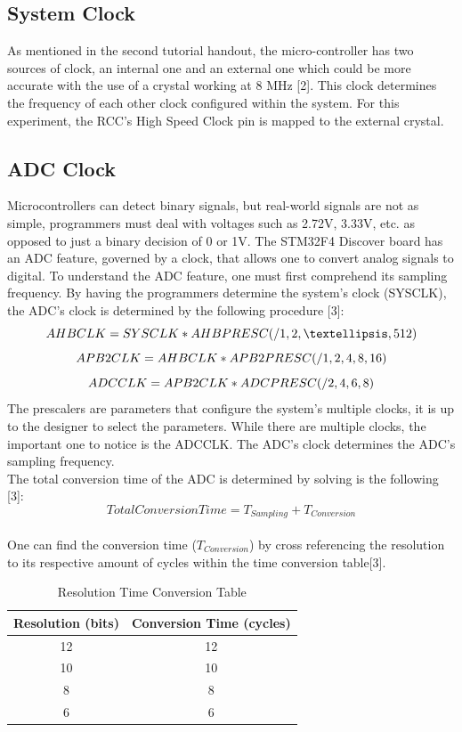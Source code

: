 \documentclass[12pt]{report}
\begin{document}
\subsection{System Clock}
As mentioned in the second tutorial handout, the micro-controller has two sources of clock, an internal one and an external one which could be more accurate with the use of a crystal working at 8 MHz [2]. This clock determines the frequency of each other clock configured within the system. For this experiment, the RCC’s High Speed Clock pin is mapped to the external crystal.
\subsection{ADC Clock}
Microcontrollers can detect binary signals, but real-world signals are not as simple, programmers must deal with voltages such as 2.72V, 3.33V, etc. as opposed to just a binary decision of 0 or 1V. The STM32F4 Discover board has an ADC feature, governed by a clock, that allows one to convert analog signals to digital. To understand the ADC feature, one must first comprehend its sampling frequency.
By having the programmers determine the system’s clock (SYSCLK), the ADC’s clock is determined by the following procedure [3]:\\
\[ AHBCLK = SYSCLK * AHBPRESC (/1, 2, …, 512)\\ \]
\[ APB2CLK = AHBCLK * APB2PRESC (/1, 2, 4, 8, 16)\\ \]
\[ ADCCLK = APB2CLK * ADCPRESC (/2, 4, 6, 8)\\ \]
The prescalers are parameters that configure the system’s multiple clocks, it is up to the designer to select the parameters. While there are multiple clocks, the important one to notice is the ADCCLK. The ADC’s clock determines the ADC’s sampling frequency.\\
The total conversion time of the ADC is determined by solving is the following [3]:\\
\[ Total Conversion Time = T_{Sampling} + T_{Conversion} \]\\
One can find the conversion time (\(T_{Conversion}\)) by cross referencing the resolution to its respective amount of cycles within the time conversion table[3].\\
\begin{table}[h]\label{adcres}
	\caption{Resolution Time Conversion Table}
	\begin{center}
		\begin{tabular}{|c|c|}
		\hline
		Resolution (bits) & Conversion Time (cycles)\\\hline
		12 & 12 \\\hline
		10  & 10 \\\hline
		8  & 8 \\\hline
		6  & 6 \\\hline
	\end{tabular}
	\end{center}
\end{table}
\end{document}
